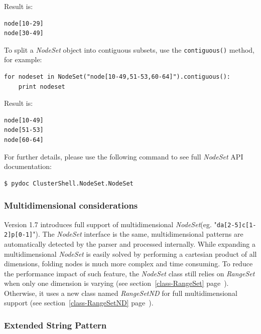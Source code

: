 \documentclass[english,a4paper]{csuserguide}
\newcommand{\NodeSet}{\textit{NodeSet}\xspace}
\newcommand{\RangeSet}{\textit{RangeSet}\xspace}
\newcommand{\RangeSetND}{\textit{RangeSetND}\xspace}
\begin{document}
Result is:
\medskip
\begin{lstlisting}[breaklines=true, breakatwhitespace=true]
node[10-29]
node[30-49]
\end{lstlisting}

\pagebreak[1]

\label{class-NodeSet-contiguous}
To split a \NodeSet object into contiguous subsets, use the \lstinline+contiguous()+ method, for example:
\medskip
\begin{lstlisting}[breaklines=true, breakatwhitespace=true]
for nodeset in NodeSet("node[10-49,51-53,60-64]").contiguous():
    print nodeset
\end{lstlisting}

Result is:
\medskip
\begin{lstlisting}[breaklines=true, breakatwhitespace=true]
node[10-49]
node[51-53]
node[60-64]
\end{lstlisting}

\bigskip

For further details, please use the following command to see full \NodeSet API documentation:
\begin{verbatim}
$ pydoc ClusterShell.NodeSet.NodeSet
\end{verbatim}

\subsubsection{Multidimensional considerations}
\label{class-NodeSet-nD}

Version 1.7 introduces full support of multidimensional \NodeSet (eg. "\verb+da[2-5]c[1-2]p[0-1]+"). The \NodeSet interface is the same, multidimensional patterns are automatically detected by the parser and processed internally. While expanding a multidimensional \NodeSet is easily solved by performing a cartesian product of all dimensions, folding nodes is much more complex and time consuming. To reduce the performance impact of such feature, the \NodeSet class still relies on \RangeSet when only one dimension is varying (see section~\ref{class-RangeSet} page~\pageref{class-RangeSet}). Otherwise, it uses a new class named \RangeSetND for full multidimensional support (see section~\ref{class-RangeSetND} page~\pageref{class-RangeSetND}).

\subsubsection{Extended String Pattern}
\label{class-NodeSet-extended-patterns}
\end{document}
